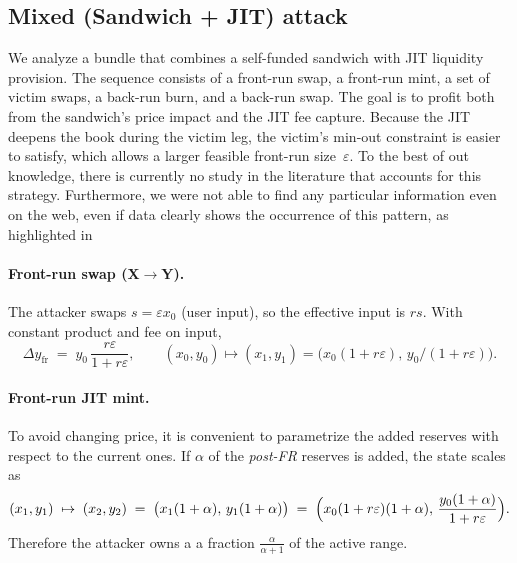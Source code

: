 \documentclass[a4paper,11pt]{article}
\begin{document}
\subsection{Mixed (Sandwich + JIT) attack}
\label{subsec:mixed-sandwich-jit}

We analyze a bundle that combines a self-funded sandwich with JIT liquidity provision. The sequence consists of a front-run swap, a front-run mint, a set of victim swaps, a back-run burn, and a back-run swap. The goal is to profit both from the sandwich’s price impact and the JIT fee capture. Because the JIT deepens the book during the victim leg, the victim’s min-out constraint is easier to satisfy, which allows a larger feasible front-run size~$\varepsilon$. To the best of out knowledge, there is currently no study in the literature that accounts for this strategy. Furthermore, we were not able to find any particular information even on the web, even if data clearly shows the occurrence of this pattern, as highlighted in \cite{gatta_di_nosse}

\paragraph{Front-run swap (X$\to$Y).}
The attacker swaps $s=\varepsilon x_0$ (user input), so the effective input is $r s$. With constant product and fee on input,
\begin{equation}
  \Delta y_{\mathrm{fr}} \;=\; y_0\,\frac{r\varepsilon}{1+r\varepsilon},
  \qquad
  (x_0,y_0)\mapsto (x_1,y_1)=\bigl(x_0(1+r\varepsilon),\, y_0/(1+r\varepsilon)\bigr).
  \label{eq:mix_dyfr}
\end{equation}

\paragraph{Front-run JIT mint.}
To avoid changing price, it is convenient to parametrize the added reserves with respect to the current ones. If $\alpha$ of the \emph{post-FR} reserves is added, the state scales as
\begin{equation}
  (x_1,y_1) \;\mapsto\; (x_2,y_2) \;=\; \bigl(x_1(1+\alpha),\, y_1(1+\alpha)\bigr)
  \;=\; \Bigl(x_0(1+r\varepsilon)(1+\alpha),\, \frac{y_0(1+\alpha)}{1+r\varepsilon}\Bigr).
  \label{eq:mix_mint}
\end{equation}
Therefore the attacker owns a a fraction $\frac{\alpha}{\alpha + 1}$ of the active range.
\end{document}
